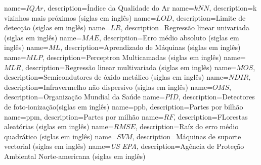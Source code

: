 {
    name=$ IQAr $,
    description={Índice da Qualidade do Ar}
}
{
    name=$ kNN $,
    description={k vizinhos mais próximos (siglas em inglês)}
}
{
    name=$ LOD $,
    description={Limite de detecção (siglas em inglês)}
}
{
    name=$ LR $,
    description={Regressão linear univariada (siglas em inglês)}
}
{
    name=$ MAE $,
    description={Erro médio absoluto (siglas em inglês)}
}
{
    name=$ ML $,
    description={Aprendizado de Máquinas (siglas em inglês)}
}
{
    name=$ MLP $,
    description={Perceptron Multicamadas (siglas em inglês)}
}
{
    name=$ MLR $,
    description={Regressão linear multivariada (siglas em inglês)}
}
{
    name=$ MOS $,
    description={Semicondutores de óxido metálico (siglas em inglês)}
}
{
    name=$ NDIR $,
    description={Infravermelho não dispersivo (siglas em inglês)}
}
{
    name=$ OMS $,
    description={Organização Mundial da Saúde}
}
{
    name=$ PID $,
    description={Detectores de foto-ionização(siglas em inglês)}
}
{
    name=ppb,
    description={Partes por bilhão}
}
{
    name=ppm,
    description={Partes por milhão}
}
{
    name=$ RF $,
    description={FLorestas aleatórias (siglas em inglês)}
}
{
    name=$ RMSE $,
    description={Raíz do erro médio quadrático (siglas em inglês)}
}
{
    name=$ SVM $,
    description={Máquinas de suporte vectorial (siglas em inglês)}
}
{
    name=\textit{US EPA},
    description={Agência de Proteção Ambiental Norte-americana (siglas em inglês)}
}
